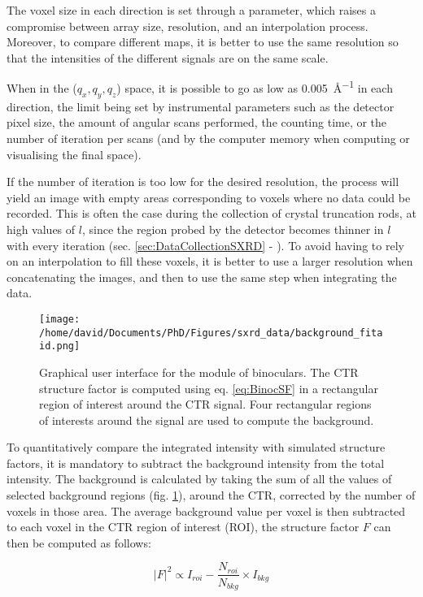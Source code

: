 The voxel size in each direction is set through a parameter, which raises a compromise between array size, resolution, and an interpolation process.
Moreover, to compare different maps, it is better to use the same resolution so that the intensities of the different signals are on the same scale.

When in the ($q_x, q_y, q_z$) space, it is possible to go as low as \qty{0.005}{\angstrom^{-1}} in each direction, the limit being set by instrumental parameters such as the detector pixel size, the amount of angular scans performed, the counting time, or the number of iteration per scans (and by the computer memory when computing or visualising the final space).

If the number of iteration is too low for the desired resolution, the process will yield an image with empty areas corresponding to voxels where no data could be recorded.
This is often the case during the collection of crystal truncation rods, at high values of $l$, since the region probed by the detector becomes thinner in $l$ with every iteration (sec. \ref{sec:DataCollectionSXRD} - \cite{Drnec2014}).
To avoid having to rely on an interpolation to fill these voxels, it is better to use a larger resolution when concatenating the images, and then to use the same step when integrating the data.

\begin{figure}[!htb]
    \texttt{[image: /home/david/Documents/PhD/Figures/sxrd\_data/background\_fitaid.png]}
    \caption{
        Graphical user interface for the  module of binoculars.
        The CTR structure factor is computed using eq. \ref{eq:BinocSF} in a rectangular region of interest around the CTR signal.
        Four rectangular regions of interests around the signal are used to compute the background.
    }
    \label{fig:BinocularsBackground}
\end{figure}

To quantitatively compare the integrated intensity with simulated structure factors, it is mandatory to subtract the background intensity from the total intensity.
The background is calculated by taking the sum of all the values of selected background regions (fig. \ref{fig:BinocularsBackground}), around the CTR, corrected by the number of voxels in those area.
The average background value per voxel is then subtracted to each voxel in the CTR region of interest (ROI), the structure factor $F$ can then be computed as follows:

\begin{equation}
    |F|^2 \propto I_{roi} - \frac{N_{roi}}{N_{bkg}} \times I_{bkg}
    \label{eq:BinocSF}
\end{equation}

